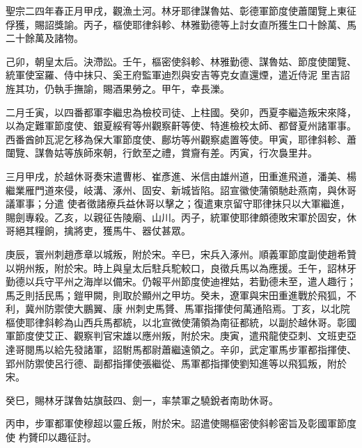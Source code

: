 
\begin{pinyinscope}

 聖宗二四年春正月甲戌，觀漁土河。林牙耶律謀魯姑、彰德軍節度使蕭闥覽上東征俘獲，賜詔獎諭。丙子，樞使耶律斜軫、林雅勤德等上討女直所獲生口十餘萬、馬二十餘萬及諸物。



 己卯，朝皇太后。決滯訟。壬午，樞密使斜軫、林雅勤德、謀魯姑、節度使闥覽、統軍使室羅、侍中抹只、奚王府監軍迪烈與安吉等克女直還煙，遣近侍泥
 里吉詔旌其功，仍執手撫諭，賜酒果勞之。甲午，幸長濼。



 二月壬寅，以四番都軍李繼忠為檢校司徒、上柱國。癸卯，西夏李繼造叛宋來降，以為定難軍節度使、銀夏綏宥等州觀察鼾等使、特進檢校太師、都督夏州諸軍事。西番酋帥瓦泥乞移為保大軍節度使、鄜坊等州觀察處置等使。甲寅，耶律斜軫、蕭闥覽、謀魯姑等族師來朝，行飲至之禮，賞齎有差。丙寅，行次裊里井。



 三月甲戌，於越休哥奏宋遣曹彬、崔彥進、米信由雄州道，田重進飛道，潘美、楊繼業雁門道來侵，岐溝、涿州、固安、新城皆陷。詔宣徽使蒲領馳赴燕南，與休哥議軍事；分遣
 使者徵諸療兵益休哥以擊之；復遣東京留守耶律抹只以大軍繼進，賜劍專殺。乙亥，以親征告陵廟、山川。丙子，統軍使耶律頗德敗宋軍於固安，休哥絕其糧餉，擒將吏，獲馬牛、器仗甚眾。



 庚辰，寰州刺趙彥章以城叛，附於宋。辛巳，宋兵入涿州。順義軍節度副使趙希贊以朔州叛，附於宋。時上與皇太后駐兵駝較口，良徵兵馬以為應援。壬午，詔林牙勤德以兵守平州之海岸以備宋。仍報平州節度使迪裡姑，若勤德未至，遣人趣行；馬乏則括民馬；鎧甲闕，則取於顯州之甲坊。癸未，遼軍與宋田重進戰於飛狐，不利，冀州防禦使大鵬翼、康
 州刺史馬贇、馬軍指揮使何萬通陷焉。丁亥，以北院樞使耶律斜軫為山西兵馬都統，以北宣微使蒲領為南征都統，以副於越休哥。彰國軍節度使艾正、觀察判官宋雄以應州叛，附於宋。庚寅，遣飛龍使亞刺、文班吏亞達哥閱馬以給先發諸軍，詔駙馬都尉蕭繼遠領之。辛卯，武定軍馬步軍都指揮使、郢州防禦使呂行德、副都指揮使張繼從、馬軍都指揮使劉知進等以飛狐叛，附於宋。



 癸巳，賜林牙謀魯姑旗鼓四、劍一，率禁軍之驍銳者南助休哥。



 丙申，步軍都軍使穆超以靈丘叛，附於宋。詔遣使賜樞密使斜軫密旨及彰國軍節度使
 杓贇印以趣征討。




\end{pinyinscope}
